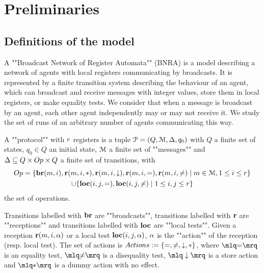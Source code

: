 \section{Preliminaries}

\subsection{Definitions of the model}
A ""Broadcast Network of Register Automata"" (BNRA) \cite{DST2013} is a model describing a network of agents with local registers communicating by broadcasts. It is represented by a finite transition system describing the behaviour of an agent, which can broadcast and receive messages with integer values, store them in local registers, or make equality tests. 
We consider that when a message is broadcast by an agent, each other agent independently may or may not receive it. 
We study the set of runs of an arbitrary number of agents communicating this way.

\begin{definition}[Protocols]
	A ""protocol"" with $r$ registers is a tuple $\mathcal{P} = (Q, \mathcal{M}, \Delta, q_0)$  with $Q$ a finite set of states, $q_0 \in Q$ an initial state, $\mathcal{M}$ a finite set of ""messages""  and $\transitions \subseteq Q \times \operations \times Q$ a finite set of transitions, with 
	\begin{multline*}
	\operations = \set{\br{\amessage}{i}, \rec{\amessage}{i}{\dummyact}, \rec{\amessage}{i}{\enregact}, \rec{\amessage}{i}{\eqtestact}, \rec{\amessage}{i}{\diseqtestact} \mid \amessage \in \messages, 1 \leq i \leq \regnum} \\ \cup  
	\set{\loc{i}{j}{\eqtestact}, \loc{i}{j}{\diseqtestact} \mid 1 \leq i,j \leq \regnum}
	\end{multline*}
	the set of operations.
	
	Transitions labelled with $\textbf{br}$ are ""broadcasts"", transitions labelled with $\textbf{r}$ are ""receptions"" and transitions labelled with $\textbf{loc}$ are ""local tests"".
	Given a reception $\textbf{r}(m, i, \alpha)$ or a local test $\textbf{loc}(i,j,\alpha)$, $\alpha$ is the ""action"" of the reception (resp. local test). 
The set of actions is $\actions := \set{\eqtestact, \diseqtestact, \enregact, \dummyact}$, where 
$\quotemarks{\eqtestact}$ is an equality test, $\quotemarks{\diseqtestact}$ is a disequality test, $\quotemarks{\enregact}$ is a store action and $\quotemarks{\dummyact}$ is a dummy action with no effect.


	
	
\end{definition}



